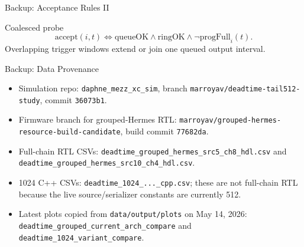 \documentclass[aspectratio=169]{beamer}
\newcommand{\groupbranch}{\texttt{marroyav/grouped-hermes-resource-build-candidate}}
\newcommand{\groupcommit}{\texttt{77682da}}
\begin{document}
\begin{frame}{Backup: Acceptance Rules II}
\scriptsize
\begin{block}{Coalesced probe}
\[
\mathrm{accept}(i,t) \iff
\mathrm{queueOK}\wedge\mathrm{ringOK}\wedge\neg\mathrm{progFull}_i(t).
\]
Overlapping trigger windows extend or join one queued output interval.
\end{block}
\end{frame}

\begin{frame}{Backup: Data Provenance}
\small
\begin{itemize}
  \item Simulation repo: \texttt{daphne\_mezz\_xc\_sim}, branch \texttt{marroyav/deadtime-tail512-study}, commit \texttt{36073b1}.
  \item Firmware branch for grouped-Hermes RTL: \groupbranch, build commit \groupcommit.
  \item Full-chain RTL CSVs: \texttt{deadtime\_grouped\_hermes\_src5\_ch8\_hdl.csv} and \texttt{deadtime\_grouped\_hermes\_src10\_ch4\_hdl.csv}.
  \item \num{1024} C++ CSVs: \texttt{deadtime\_1024\_...\_cpp.csv}; these are not full-chain RTL because the live source/serializer constants are currently \num{512}.
  \item Latest plots copied from \texttt{data/output/plots} on May 14, 2026: \texttt{deadtime\_grouped\_current\_arch\_compare} and \texttt{deadtime\_1024\_variant\_compare}.
\end{itemize}
\end{frame}
\end{document}
